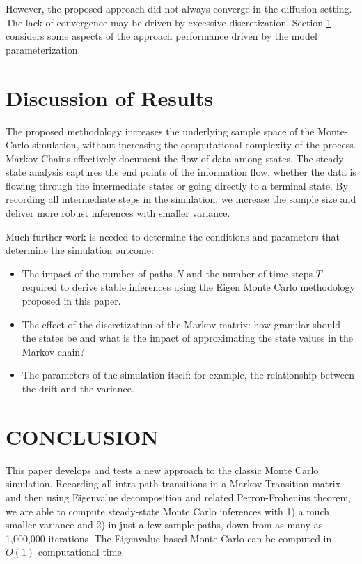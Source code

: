 \documentclass{wscpaperproc}
\theoremstyle{wsc}
\begin{document}
However, the proposed approach did not always converge in the diffusion setting. The lack of convergence may be driven by excessive discretization. Section \ref{simulation-parameters} considers some aspects of the approach performance driven by the model parameterization.


\section{Discussion of Results}\label{simulation-parameters}

The proposed methodology increases the underlying sample space of the Monte-Carlo simulation, without increasing the computational complexity of the process. Markov Chains effectively document the flow of data among states. The steady-state analysis captures the end points of the information flow, whether the data is flowing through the intermediate states or going directly to a terminal state. By recording all intermediate steps in the simulation, we increase the sample size and deliver more robust inferences with smaller variance. 

Much further work is needed to determine the conditions and parameters that determine the simulation outcome:
\begin{itemize}
    \item The impact of the number of paths $N$ and the number of time steps $T$  required to derive stable inferences using the Eigen Monte Carlo methodology proposed in this paper.
    \item The effect of the discretization of the Markov matrix: how granular should the states be and what is the impact of approximating the state values in the Markov chain?
    \item The parameters of the simulation itself: for example, the relationship between the drift and the variance. 
\end{itemize} 


\section{CONCLUSION}

This paper develops and tests a new approach to the classic Monte Carlo simulation. Recording all intra-path transitions in a Markov Transition matrix and then using Eigenvalue decomposition and related Perron-Frobenius theorem, we are able to compute steady-state Monte Carlo inferences with 1) a much smaller variance and 2) in just a few sample paths, down from as many as 1,000,000 iterations. The Eigenvalue-based Monte Carlo can be computed in $O(1)$ computational time. 
\end{document}
